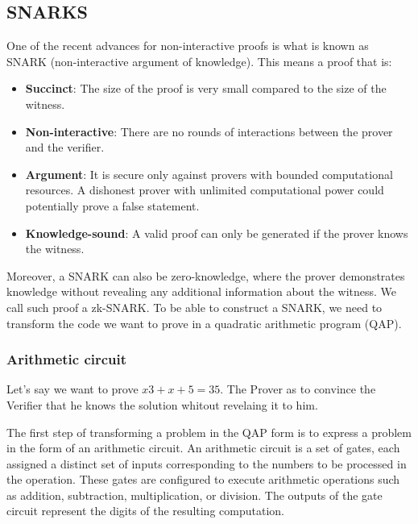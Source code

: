 \subsection{SNARKS}
One of the recent advances for non-interactive proofs is what is known as SNARK (non-interactive argument of knowledge).
This means a proof that is:
\begin{itemize}
\item \textbf{Succinct}: The size of the proof is very small compared to the size of the witness.
\item \textbf{Non-interactive}: There are no rounds of interactions between the prover and the verifier.
\item \textbf{Argument}: It is secure only against provers with bounded computational resources. A dishonest prover with unlimited computational power could potentially prove a false statement.
\item \textbf{Knowledge-sound}: A valid proof can only be generated if the prover knows the witness. \cite{NZ20}
\end{itemize}

Moreover, a SNARK can also be zero-knowledge, where the prover demonstrates knowledge without revealing any additional information about the witness. We call such proof a zk-SNARK.
To be able to construct a SNARK, we need to transform the code we want to prove in a quadratic arithmetic program (QAP).


\subsubsection{Arithmetic circuit}
\label{subsec:ac}

Let's say we want to prove $x3+x+5=35$.
The Prover as to convince the Verifier that he knows the solution whitout revelaing it to him.

The first step of transforming a problem in the QAP form is to express a problem in the form of an arithmetic circuit.
An arithmetic circuit is a set of gates, each assigned a distinct set of inputs corresponding to the numbers to be processed in the operation.
These gates are configured to execute arithmetic operations such as addition, subtraction, multiplication, or division. The outputs of the gate circuit represent the digits of the resulting computation.

